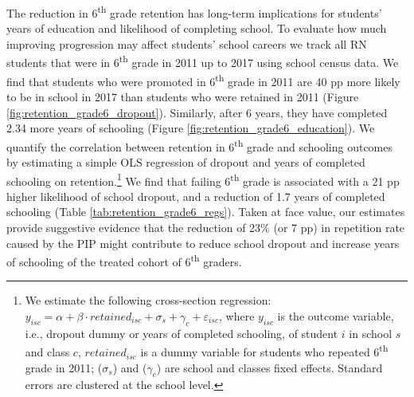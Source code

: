 \documentclass[11pt,a4paper]{article}
\begin{document}
\clearpage


The reduction in 6\textsuperscript{th} grade retention has long-term implications for students’ years of education and likelihood of completing school. To evaluate how much improving progression may affect students' school careers we track all RN students that were in 6\textsuperscript{th} grade in 2011 up to 2017 using school census data. We find that students who were promoted in 6\textsuperscript{th} grade in 2011 are 40 pp more likely to be in school in 2017 than students who were retained in 2011 (Figure \ref{fig:retention_grade6_dropout}). Similarly, after 6 years, they have completed 2.34 more years of schooling (Figure \ref{fig:retention_grade6_education}). We quantify the correlation between retention in 6\textsuperscript{th} grade and schooling outcomes by estimating a simple OLS regression of dropout and years of completed schooling on retention.\footnote{We estimate the following cross-section regression: $y_{isc} = \alpha + \beta \cdot retained_{isc} + \sigma_{s} + \gamma_{c} + \varepsilon_{isc}$, where $y_{isc}$ is the outcome variable, i.e., dropout dummy or years of completed schooling, of student $i$ in school $s$ and class $c$, $retained_{isc}$ is a dummy variable for students who repeated 6\textsuperscript{th} grade in 2011; ($\sigma_{s}$) and ($\gamma_{c}$) are school and classes fixed effects. Standard errors are clustered at the school level.} We find that failing 6\textsuperscript{th} grade is associated with a 21 pp higher likelihood of school dropout, and a reduction of 1.7 years of completed schooling (Table \ref{tab:retention_grade6_regs}). Taken at face value, our estimates provide suggestive evidence that the reduction of 23\% (or 7 pp) in repetition rate caused by the PIP might contribute to reduce school dropout and increase years of schooling of the treated cohort of 6\textsuperscript{th} graders.
\end{document}
